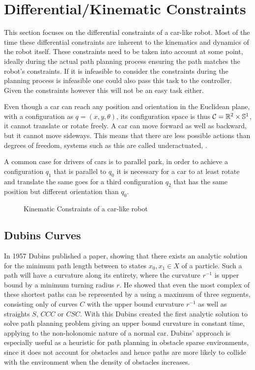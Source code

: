 \section{Differential/Kinematic Constraints}\label{sec:differentialConstraints}
This section focuses on the differential constraints of a car-like robot. Most of the time these differential constraints are inherent to the kinematics and dynamics of the robot itself. These constraints need to be taken into account at some point, ideally during the actual path planning process ensuring the path matches the robot's constraints. If it is infeasible to consider the constraints during the planning process is infeasible one could also pass this task to the controller. Given the constraints however this will not be an easy task either. \cite{LaValle.2006}

Even though a car can reach any position and orientation in the Euclidean plane, with a configuration as $q = (x,y,\theta)$, its configuration space is thus $\mathcal{C} = \mathbb{R}^2 \times \mathbb{S}^1$, it cannot translate or rotate freely. A car can move forward as well as backward, but it cannot move sideways. This means that there are less possible actions than degrees of freedom, systems such as this are called underactuated, \cite{LaValle.2006}.

A common case for drivers of cars is to parallel park, in order to achieve a configuration $q_1$ that is parallel to $q_0$ it is necessary for a car to at least rotate and translate the same goes for a third configuration $q_2$ that has the same position but different orientation than $q_0$. \cite{Latombe.1991}

\begin{figure}[h]
    \caption{Kinematic Constraints of a car-like robot}
    \label{fig:kinematicConstraints}
\end{figure}

\subsection{Dubins Curves}
In 1957 Dubins published a paper, showing that there exists an analytic solution for the minimum path length between to states $x_0, x_1 \in X$ of a particle. Such a path will have a curvature along its entirety, where the curvature $r^{-1}$ is upper bound by a minimum turning radius $r$. He showed that even the most complex of these shortest paths can be represented by a using a maximum of three segments, consisting only of curves $C$ with the upper bound curvature $r^{-1}$ as well as straights $S$, $CCC$ or $CSC$. \cite{Dubins.1957} With this Dubins created the first analytic solution to solve path planning problem giving an upper bound curvature in constant time, applying to the non-holonomic nature of a normal car. Dubins' approach is especially useful as a heuristic for path planning in obstacle sparse environments, since it does not account for obstacles and hence paths are more likely to collide with the environment when the density of obstacles increases. 

